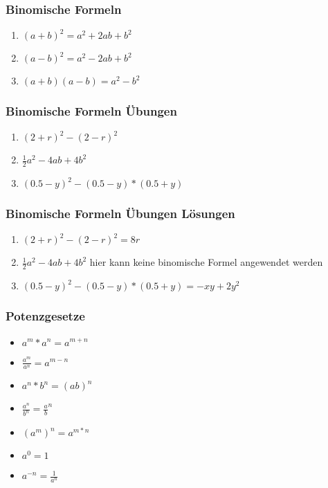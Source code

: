 \begin{frame}
    \frametitle{Binomische Formeln}
    \begin{enumerate}
        \vfill \item $(a+b)^2 = a^2 + 2ab + b^2$
        \vfill \item $(a-b)^2 = a^2 - 2ab + b^2$
        \vfill \item $(a+b)(a-b) = a^2 - b^2$
    \end{enumerate}
\end{frame}

\begin{frame}
    \frametitle{Binomische Formeln Übungen}
    \begin{enumerate}
        \vfill \item $(2+r)^2 - (2-r)^2$
        \vfill \item $\frac{1}{2}a^2 - 4ab + 4b^2$
        \vfill \item $(0.5-y)^2 - (0.5 - y)*(0.5 + y)$
    \end{enumerate}
\end{frame}

\begin{frame}
    \frametitle{Binomische Formeln Übungen Lösungen}
    \begin{enumerate}
        \vfill \item $(2+r)^2 - (2-r)^2 = 8r$
        \vfill \item $\frac{1}{2}a^2 - 4ab + 4b^2$ hier kann keine binomische Formel angewendet werden
        \vfill \item $(0.5-y)^2 - (0.5 - y)*(0.5 + y) = -xy+2y^2$
    \end{enumerate}
\end{frame}


\begin{frame}
    \frametitle{Potenzgesetze}
	\begin{itemize}
		\vfill \item $a^m * a^n = a^{m+n}$
		\vfill \item $\frac{a^m}{a^n} = a^{m-n}$
		\vfill \item $a^n * b^n = (ab)^n$
		\vfill \item $\frac{a^n}{b^n} = \frac{a}{b}^n$
		\vfill \item $(a^m)^n = a^{m*n}$
		\vfill \item $a^0 = 1$
		\vfill \item $a^{-n} = \frac{1}{a^n}$
	\end{itemize}
\end{frame}

